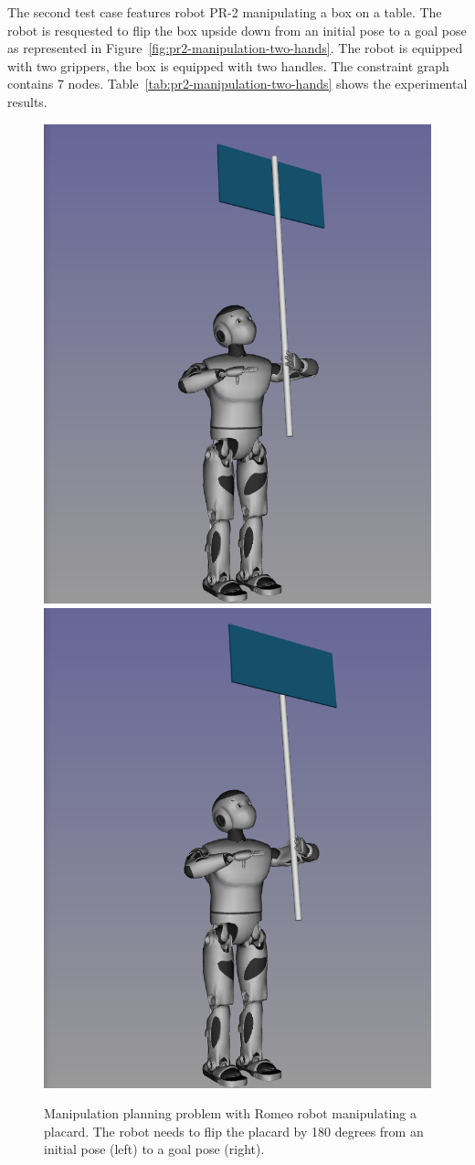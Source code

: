The second test case features robot PR-2 manipulating a box on a table. The robot is resquested to flip the box upside down from an initial pose to a goal pose as represented in Figure~\ref{fig:pr2-manipulation-two-hands}. The robot is equipped with two grippers, the box is equipped with two handles. The constraint graph contains 7 nodes. Table~\ref{tab:pr2-manipulation-two-hands} shows the experimental results.


\begin{figure}
  \begin{center}
    \includegraphics[width=.49\linewidth]{figures/romeo-placard-init.png}
    \includegraphics[width=.49\linewidth]{figures/romeo-placard-goal.png}    
  \end{center}
  \caption{Manipulation planning problem with Romeo robot manipulating a placard. The robot needs to flip the placard by 180 degrees from an initial pose (left) to a goal pose (right).}
  \label{fig:romeo-placard}
\end{figure}

